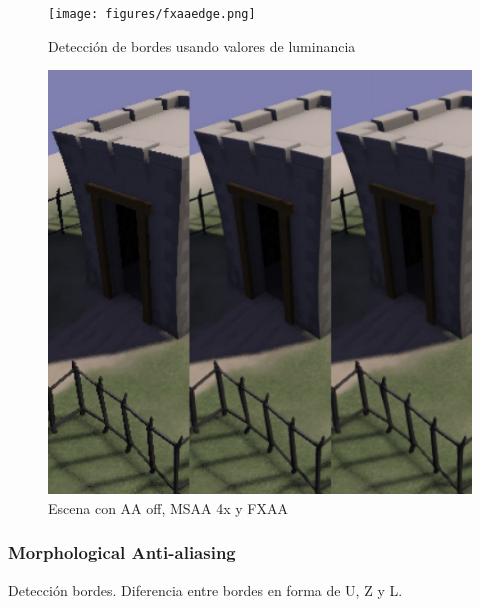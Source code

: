 \documentclass[withindex, glossary]{cam-thesis}
\begin{document}
\begin{figure}[!htbp]
    \texttt{[image: figures/fxaaedge.png]}
    \caption{Detección de bordes usando valores de luminancia\cite{fxaa2}}
    \label{fxaaedge}
\end{figure}

\begin{figure}[!htbp]
    \includegraphics[width=.8\linewidth]{figures/fxaacomparison.png}
    \caption{Escena con AA off, MSAA 4x y FXAA }
    \label{fxaacomparison}
\end{figure}

\subsubsection{Morphological Anti-aliasing}

Detección bordes\cite{Reshetov:2009:MA:1572769.1572787}. Diferencia entre bordes en forma de U, Z y L.
\end{document}
